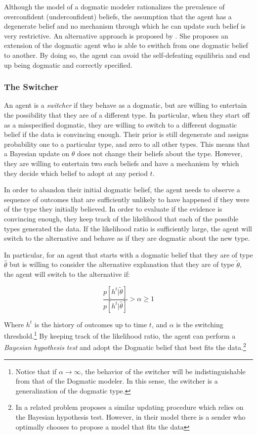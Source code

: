 \documentclass[
  12pt,
]{article}
\begin{document}
Although the model of a dogmatic modeler rationalizes the prevalence of
overconfident (underconfident) beliefs, the assumption that the agent
has a degenerate belief and no mechanism through which he can update
such belief is very restrictive. An alternative approach is proposed by
\citet{Ba2023}. She proposes an extension of the dogmatic agent who is
able to swithch from one dogmatic belief to another. By doing so, the
agent can avoid the self-defeating equilibria and end up being dogmatic
and correctly specified.

\hypertarget{the-switcher}{%
\subsubsection{The Switcher}\label{the-switcher}}

An agent is a \emph{switcher} if they behave as a dogmatic, but are
willing to entertain the possibility that they are of a different type.
In particular, when they start off as a misspecified dogmatic, they are
willing to switch to a different dogmatic belief if the data is
convincing enough. Their prior is still degenerate and assigns
probability one to a particular type, and zero to all other types. This
means that a Bayesian update on \(\theta\) does not change their beliefs
about the type. However, they are willing to entertain two such beliefs
and have a mechanism by which they decide which belief to adopt at any
period \(t\).

In order to abandon their initial dogmatic belief, the agent needs to
observe a sequence of outcomes that are sufficiently unlikely to have
happened if they were of the type they initially believed. In order to
evaluate if the evidence is convincing enough, they keep track of the
likelihood that each of the possible types generated the data. If the
likelihood ratio is sufficiently large, the agent will switch to the
alternative and behave as if they are dogmatic about the new type.

In particular, for an agent that starts with a dogmatic belief that they
are of type \(\hat{\theta}\) but is willing to consider the alternative
explanation that they are of type \(\tilde{\theta}\), the agent will
switch to the alternative if:

\[\frac{p[h^t|\tilde{\theta}]}{p[h^t|\hat{\theta}]} > \alpha\geq 1\]

Where \(h^t\) is the history of outcomes up to time \(t\), and
\(\alpha\) is the switching
threshold.\footnote{Notice that if $\alpha \to \infty$, the behavior of the switcher will be indistinguishable from that of the Dogmatic modeler. 
In this sense, the switcher is a generalization of the dogmatic type.}
By keeping track of the likelihood ratio, the agent can perform a
\emph{Bayesian hypothesis test} and adopt the Dogmatic belief that best
fits the
data.\footnote{In a related problem \citet{Schwarstein2021} proposes a similar updating procedure which relies on the Bayesian hypothesis test. However, in their model there is a sender who optimally chooses to propose a model that fits the data}
\end{document}
